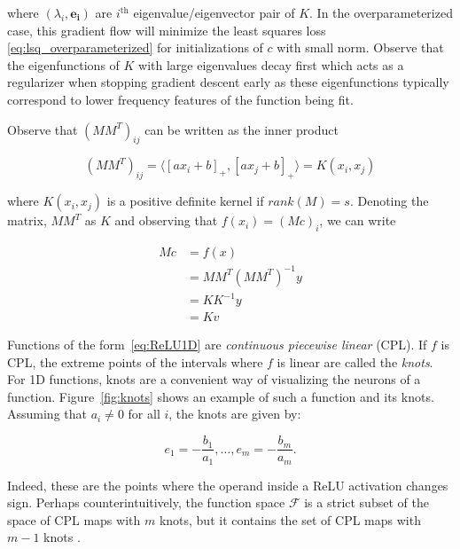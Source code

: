 where $(\lambda_i, \mathbf{e_i})$ are $i^\text{th}$ eigenvalue/eigenvector pair of $K$. In the overparameterized case, this gradient flow will minimize the least squares loss \eqref{eq:lsq_overparameterized} for initializations of $c$ with small norm. Observe that the eigenfunctions of $K$ with large eigenvalues decay first which acts as a regularizer when stopping gradient descent early as these eigenfunctions typically correspond to lower frequency features of the function being fit. 


Observe that $(M M^T)_{ij}$ can be written as the inner product 

\begin{equation}\label{eq:lsq_kernel}
(M M^T)_{ij} = \langle [a x_i + b]_+, [a x_j + b]_+ \rangle = K(x_i, x_j)
\end{equation}

where $K(x_i, x_j)$ is a positive definite kernel if $rank(M) = s$. Denoting the matrix, $M M^T$ as $K$ and observing that $f(x_i) = (Mc)_i$, we can write

\begin{equation}
\begin{aligned}
Mc &= f(x)\\
   &= M M^T (M M^T)^{-1} y\\
   & = K K^{-1}y\\
   & = Kv
\end{aligned}
\end{equation}



Functions of the form~\eqref{eq:ReLU1D} are \emph{continuous piecewise linear} (CPL). If $f$ is CPL, the extreme points of the intervals where $f$ is linear are called the \emph{knots}. For 1D functions, knots are a convenient way of visualizing the neurons of a function. Figure~\ref{fig:knots} shows an example of such a function and its knots. Assuming that $a_i \neq 0$ for all $i$, the knots are given by:

\begin{equation}\label{eq:nodes}
e_1 = -\frac{b_1}{a_1}, \ldots, e_m = -\frac{b_m}{a_m}.
\end{equation}

Indeed, these are the points where the operand inside a ReLU activation changes sign. Perhaps counterintuitively, the function space $\mathcal F$ is a strict subset of the space of CPL maps with $m$ knots, but it contains the set of CPL maps with $m-1$ knots .


